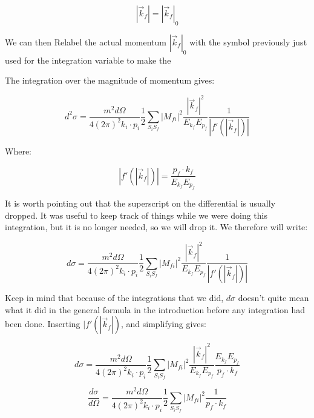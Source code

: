\documentclass[a4]{article}
\begin{document}
    \begin{equation}
        |\vec{k}_f| = |\vec{k}_f|_0
    \end{equation}

    We can then Relabel the actual momentum $|\vec{k}_f|_0$ with the symbol previously just used for the integration variable to make the 


    The integration over the magnitude of momentum gives:

    \begin{equation}
        d^2 \sigma = \frac{m^2 d \Omega}{4 (2 \pi)^2 k_i \cdot p_i} \frac{1}{2} \sum_{S_i S_f} |M_{fi}|^2 \frac{|\vec{k}_f|^2}{E_{k_f} E_{p_f}} \frac{1}{|f'(|\vec{k}_f|)|}
    \end{equation}

    Where:

    \begin{equation}
        |f'(|\vec{k}_f|)| = \frac{p_f \cdot k_f}{E_{k_f} E_{p_f}}
    \end{equation}

    It is worth pointing out that the superscript on the differential is usually dropped. It was useful to keep track of things while we were doing this integration,
    but it is no longer needed, so we will drop it. We therefore will write:

    \begin{equation}
        d \sigma = \frac{m^2 d \Omega}{4 (2 \pi)^2 k_i \cdot p_i} \frac{1}{2} \sum_{S_i S_f} |M_{fi}|^2 \frac{|\vec{k}_f|^2}{E_{k_f} E_{p_f}} \frac{1}{|f'(|\vec{k}_f|)|}
    \end{equation}

    Keep in mind that because of the integrations that we did, $d \sigma$ doesn't quite mean what it did in the general formula in the introduction before any
    integration had been done. Inserting $|f'(|\vec{k}_f|)$, and simplifying gives:

    \begin{equation}
        d \sigma = \frac{m^2 d \Omega}{4 (2 \pi)^2 k_i \cdot p_i} \frac{1}{2} \sum_{S_i S_f} |M_{fi}|^2 \frac{|\vec{k}_f|^2}{E_{k_f} E_{p_f}} \frac{E_{k_f} E_{p_f}}{p_f \cdot k_f}
    \end{equation}

    \begin{equation}
        \frac{d \sigma}{d \Omega} = \frac{m^2 d \Omega}{4 (2 \pi)^2 k_i \cdot p_i} \frac{1}{2} \sum_{S_i S_f} |M_{fi}|^2 \frac{1}{p_f \cdot k_f}
    \end{equation}
\end{document}
